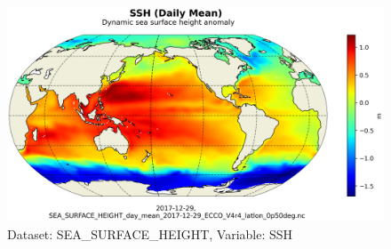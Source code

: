 \begin{figure}[H]
\centering
\includegraphics[scale=0.55]{../images/plots/latlon_plots/Sea_Surface_Height/SSH.png}
\caption{Dataset: SEA\_SURFACE\_HEIGHT, Variable: SSH}
\label{tab:table-SEA_SURFACE_HEIGHT_SSH-Plot}
\end{figure}
\pagebreak
